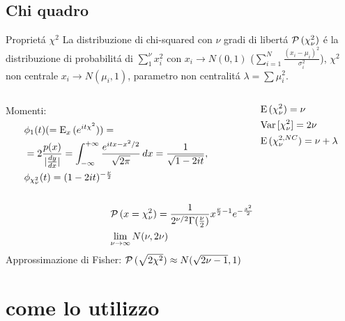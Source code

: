 \subsection{Chi quadro}

\begin{frame}{Propriet\'a $\chi^2$}
La distribuzione di chi-squared con $\nu$ gradi di libert\'a $\prob{(\chi_{\nu}^2)}$ \'e la distribuzione di probabilit\'a di $\sum_1^{\nu}x_i^2$ con $x_i\to N(0,1)$ ($\sum_{i=1}^N\frac{(x_i-\mu_i)^2}{\sigma_i^2}$), $\chi^2$ non centrale $x_i\to N(\mu_i,1)$, parametro non centralit\'a $\lambda=\sum\mu_i^2$.
\begin{columns}[T]
	\begin{column}{0.7\textwidth}
		Momenti:
		\begin{align*}
		&\phi_1(t)(=\E_x{(\exp{it\chi^2})})=\\
		&=2\frac{p(x)}{|\TDy{x}{y}|}=\intsinf{}\frac{\exp{itx-x^2/2}}{\sqrt{2\pi}}\,dx=\frac{1}{\sqrt{1-2it}},\\
		&\phi_{\chi^2_{\nu}}(t)=(1-2it)\expy{-\frac{\nu}{2}}
		\end{align*}
	\end{column}
	\begin{column}{0.3\textwidth}
		\begin{align*}
		&\E{(\chi^2_{\nu})}=\nu\\
		&\var{[\chi_{\nu}^2]}=2\nu\\
		&\E{(\chi^{2,NC}_{\nu})}=\nu+\lambda
		\end{align*}
	\end{column}
\end{columns}
\begin{align*}
&\prob{(x=\chi^2_{\nu})}=\frac{1}{2\expy{\nu/2}\Gamma(\frac{\nu}{2})}x\expy{\frac{\nu}{2}-1}\exp{-\frac{x^2}{2}}\\
&\lim_{\nu\to\infty}N(\nu,2\nu)
\end{align*}
Approssimazione di Fisher: $\prob{(\sqrt{2\chi^2})}\approx N(\sqrt{2\nu-1},1)$
\end{frame}

\section{come lo utilizzo}

